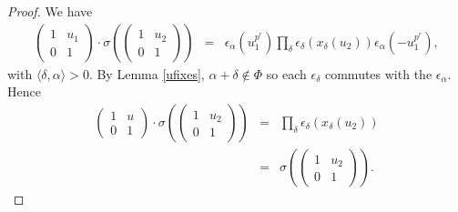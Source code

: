 \begin{proof}
We have
\begin{eqnarray*}
\left(\begin{matrix}1 & u_1 \\ 0 & 1 \end{matrix}\right)
\cdot
\sigma\left(\left(\begin{matrix} 1 & u_2 \\ 0 & 1\end{matrix}\right)\right)
&=&
\epsilon_\alpha(u_1^{p^r}) \prod_\delta \epsilon_\delta\left(x_\delta\left(u_2\right)\right) \epsilon_\alpha(-u_1^{p^r}),
\end{eqnarray*}
with $\langle \delta, \alpha \rangle > 0$. By Lemma \ref{ufixes}, $\alpha + \delta \notin \Phi$ so each $\epsilon_\delta$ commutes with the $\epsilon_\alpha$. Hence
\begin{eqnarray*}
  \left( \begin{matrix} 1 & u \\ 0 & 1 \end{matrix}\right) \cdot \sigma\left(\left(\begin{matrix} 1 & u_2 \\ 0 & 1 \end{matrix} \right)\right)
    &=& 
    \prod_\delta \epsilon_\delta\left(x_\delta\left( u_2 \right)\right) \\
    &=& 
    \sigma\left(\left(\begin{matrix} 1 & u_2 \\ 0 & 1 \end{matrix} \right) \right).
    \end{eqnarray*}
\end{proof}

